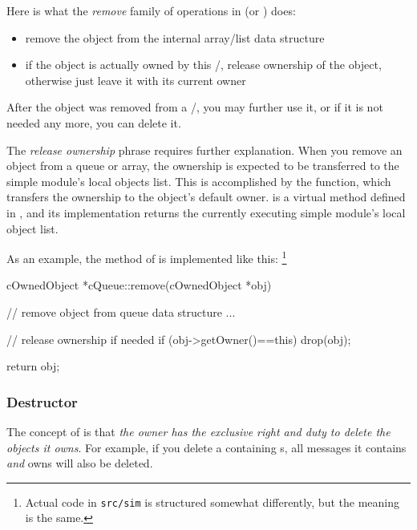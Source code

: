 Here is what the \textit{remove} family of operations in 
(or ) does:

\begin{itemize}
    \item{remove the object from the internal array/list data structure}

    \item{if the object is actually owned by this /,
    release ownership of the object, otherwise just leave it with
    its current owner}
\end{itemize}

After the object was removed from a /,
you may further use it, or if it is not needed any more, you can delete it.

The \textit{release ownership} phrase requires further explanation.
When you remove an object from a queue or array, the ownership
is expected to be transferred to the simple module's local objects list.
This is accomplished by the  function, which transfers the
ownership to the object's default owner.
 is a virtual method defined in ,
and its implementation returns
the currently executing simple module's local object list.

As an example, the  method of  is
implemented like this:
  \footnote{Actual code in \texttt{src/sim} is structured somewhat
  differently, but the meaning is the same.}

\begin{cpp}
cOwnedObject *cQueue::remove(cOwnedObject *obj)
{
    // remove object from queue data structure
    ...

    // release ownership if needed
    if (obj->getOwner()==this)
        drop(obj);

    return obj;
}
\end{cpp}


\subsubsection{Destructor}
\label{sec:sim-lib:ownership-and-container-destructor}

The concept of  is that \textit{the owner has the
exclusive right and duty to delete the objects it owns}.
For example, if you delete a  containing s,
all messages it contains \textit{and} owns will also be deleted.

